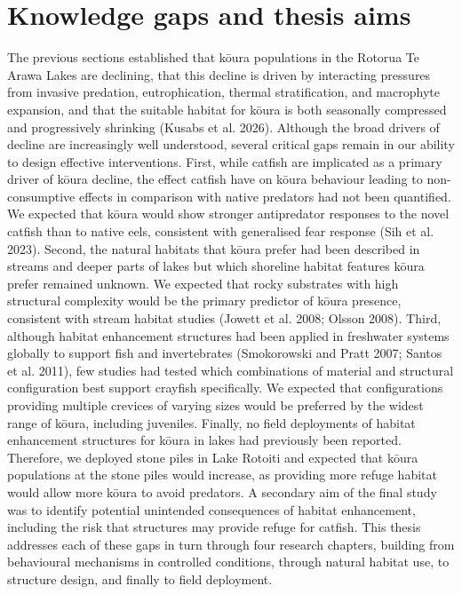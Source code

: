\documentclass[
  12pt,
  a4paper,
  oneside]{scrbook}
\begin{document}
\section{Knowledge gaps and thesis
aims}\label{knowledge-gaps-and-thesis-aims}

The previous sections established that kōura populations in the Rotorua
Te Arawa Lakes are declining, that this decline is driven by interacting
pressures from invasive predation, eutrophication, thermal
stratification, and macrophyte expansion, and that the suitable habitat
for kōura is both seasonally compressed and progressively shrinking
(Kusabs et al. 2026). Although the broad drivers of decline are
increasingly well understood, several critical gaps remain in our
ability to design effective interventions. First, while catfish are
implicated as a primary driver of kōura decline, the effect catfish have
on kōura behaviour leading to non-consumptive effects in comparison with
native predators had not been quantified. We expected that kōura would
show stronger antipredator responses to the novel catfish than to native
eels, consistent with generalised fear response (Sih et al. 2023).
Second, the natural habitats that kōura prefer had been described in
streams and deeper parts of lakes but which shoreline habitat features
kōura prefer remained unknown. We expected that rocky substrates with
high structural complexity would be the primary predictor of kōura
presence, consistent with stream habitat studies (Jowett et al. 2008;
Olsson 2008). Third, although habitat enhancement structures had been
applied in freshwater systems globally to support fish and invertebrates
(Smokorowski and Pratt 2007; Santos et al. 2011), few studies had tested
which combinations of material and structural configuration best support
crayfish specifically. We expected that configurations providing
multiple crevices of varying sizes would be preferred by the widest
range of kōura, including juveniles. Finally, no field deployments of
habitat enhancement structures for kōura in lakes had previously been
reported. Therefore, we deployed stone piles in Lake Rotoiti and
expected that kōura populations at the stone piles would increase, as
providing more refuge habitat would allow more kōura to avoid predators.
A secondary aim of the final study was to identify potential unintended
consequences of habitat enhancement, including the risk that structures
may provide refuge for catfish. This thesis addresses each of these gaps
in turn through four research chapters, building from behavioural
mechanisms in controlled conditions, through natural habitat use, to
structure design, and finally to field deployment.
\end{document}
